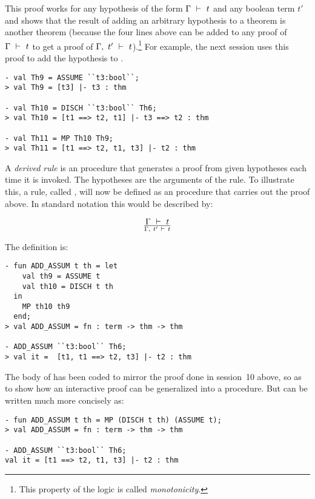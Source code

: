 \noindent This proof works for any hypothesis of the form $\Gamma\ \vdash\  t$
and any boolean term $t'$ and shows that the result of adding an
arbitrary hypothesis to a theorem is another theorem (because the four
lines above can be added to any proof of $\Gamma\ \vdash\  t$ to get a
proof of $\Gamma,\ t'\ \vdash\  t$).\footnote{This property of the logic is
  called {\it monotonicity}.} For example, the next session uses this
proof to add the hypothesis  to .

\begin{session}\begin{verbatim}
- val Th9 = ASSUME ``t3:bool``;
> val Th9 = [t3] |- t3 : thm

- val Th10 = DISCH ``t3:bool`` Th6;
> val Th10 = [t1 ==> t2, t1] |- t3 ==> t2 : thm

- val Th11 = MP Th10 Th9;
> val Th11 = [t1 ==> t2, t1, t3] |- t2 : thm
\end{verbatim}\end{session}


    A {\it derived rule\/} is an \ML{} procedure that generates a proof
    from given hypotheses each time it is invoked. The hypotheses are
    the arguments of the rule.  To illustrate this, a rule, called
    , will now be defined as an \ML{} procedure that
    carries out the proof above. In standard notation this would be
    described by:

\[ \Gamma\ \vdash\  t\over \Gamma,\ t'\ \vdash\  t \]

\noindent The \ML{} definition is:

\begin{session}\begin{verbatim}
- fun ADD_ASSUM t th = let
    val th9 = ASSUME t
    val th10 = DISCH t th
  in
    MP th10 th9
  end;
> val ADD_ASSUM = fn : term -> thm -> thm

- ADD_ASSUM ``t3:bool`` Th6;
> val it =  [t1, t1 ==> t2, t3] |- t2 : thm
\end{verbatim}\end{session}

\noindent The body of  has been coded  to mirror  the proof done
in session~10 above, so as to show how an interactive proof can be
generalized into a procedure.  But  can be written much
more concisely as:

\begin{session}\begin{verbatim}
- fun ADD_ASSUM t th = MP (DISCH t th) (ASSUME t);
> val ADD_ASSUM = fn : term -> thm -> thm

- ADD_ASSUM ``t3:bool`` Th6;
val it = [t1 ==> t2, t1, t3] |- t2 : thm
\end{verbatim}\end{session}


